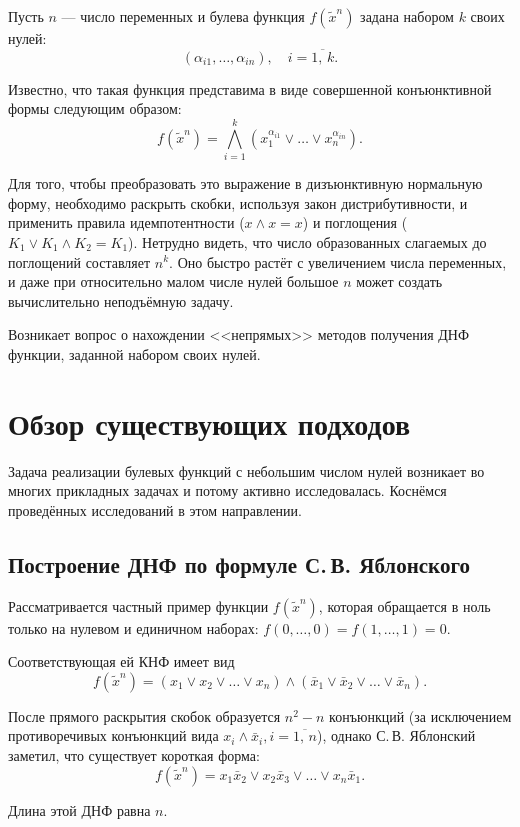 \documentclass[12pt,a4paper,oneside,fleqn,leqno]{article}
\theoremstyle{definition}
\begin{document}
	Пусть $n$ --- число переменных и булева функция $f(\tilde x^n)$ задана набором $k$ своих нулей:
	$$
		(\alpha_{i1},\ldots,\alpha_{in}),\quad i=\overline{1,\,k}.
	$$\par
	Известно, что такая функция представима в виде совершенной конъюнктивной формы следующим образом:
	$$
		f(\tilde x^n) = \bigwedge_{i = 1}^k (x_1^{\alpha_{i1}} \vee \ldots \vee x_n^{\alpha_{in}}).
	$$\par
	Для того, чтобы преобразовать это выражение в дизъюнктивную нормальную форму, необходимо раскрыть скобки, используя закон дистрибутивности, и применить правила идемпотентности ($x\wedge x = x$) и поглощения ($K_1 \vee K_1\wedge K_2 = K_1$). %
Нетрудно видеть, что число образованных слагаемых до поглощений составляет $n^k.$ Оно быстро растёт с увеличением числа переменных, и даже при относительно малом числе нулей большое $n$ может создать вычислительно неподъёмную задачу.\par
	Возникает вопрос о нахождении <<непрямых>> методов получения ДНФ функции, заданной набором своих нулей.
	\section{Обзор существующих подходов}
		Задача реализации булевых функций с небольшим числом нулей возникает во многих прикладных задачах и потому активно исследовалась. Коснёмся проведённых исследований в этом направлении.
		\subsection{Построение ДНФ по формуле С.\,В. Яблонского}\label{jab}
			Рассматривается частный пример функции $f(\tilde x^n)$, которая обращается в ноль только на нулевом и единичном наборах: $f(0,\ldots,0) = f(1,\ldots,1) = 0.$\par
			Соответствующая ей КНФ имеет вид
			$$
				f(\tilde x^n) = (x_1 \vee x_2 \vee \ldots \vee x_n)\wedge(\bar{x}_1 \vee \bar{x}_2 \vee \ldots \vee \bar{x}_n).
			$$\par
			После прямого раскрытия скобок образуется $n^2 - n$ конъюнкций (за исключением противоречивых конъюнкций вида $x_i\wedge\bar{x}_i, i = \overline{1,\,n}$), однако С.\,В. Яблонский заметил, что существует короткая форма:
			$$
				f(\tilde x^n) = x_1\bar{x}_2 \vee x_2\bar{x}_3 \vee \ldots \vee x_n \bar{x}_1.
			$$\par
			Длина этой ДНФ равна $n.$
\end{document}
